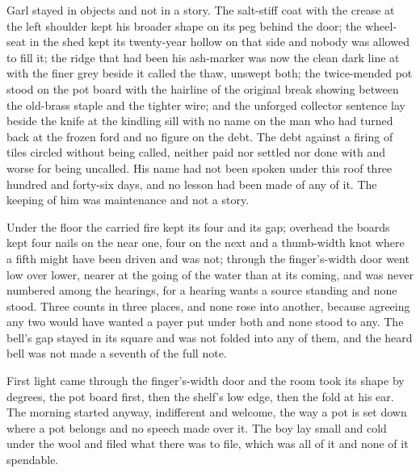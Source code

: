 Garl stayed in objects and not in a story. The salt-stiff coat with the crease at the left shoulder kept his broader shape on its peg behind the door; the wheel-seat in the shed kept its twenty-year hollow on that side and nobody was allowed to fill it; the ridge that had been his ash-marker was now the clean dark line at  with the finer grey beside it called the thaw, unswept both; the twice-mended pot stood on the pot board with the hairline of the original break showing between the old-brass staple and the tighter wire; and the unforged collector sentence lay beside the knife at the kindling sill with no name on the man who had turned back at the frozen ford and no figure on the debt. The debt against a firing of tiles circled without being called, neither paid nor settled nor done with and worse for being uncalled. His name had not been spoken under this roof three hundred and forty-six days, and no lesson had been made of any of it. The keeping of him was maintenance and not a story.

Under the floor the carried fire kept its four and its gap; overhead the boards kept four nails on the near one, four on the next and a thumb-width knot where a fifth might have been driven and was not; through the finger's-width door  went low over lower, nearer at the going of the water than at its coming, and was never numbered among the hearings, for a hearing wants a source standing and none stood. Three counts in three places, and none rose into another, because agreeing any two would have wanted a payer put under both and none stood to any. The bell's gap stayed in its square and was not folded into any of them, and the heard bell was not made a seventh of the full note.

First light came through the finger's-width door and the room took its shape by degrees, the pot board first, then the shelf's low edge, then the fold at his ear. The morning started anyway, indifferent and welcome, the way a pot is set down where a pot belongs and no speech made over it. The boy lay small and cold under the wool and filed what there was to file, which was all of it and none of it spendable.

\scenebreak

